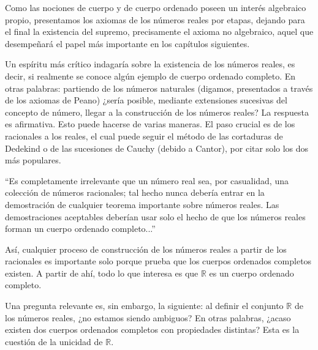 \documentclass[12pt,oneside]{book}
\begin{document}
Como las nociones de cuerpo y de cuerpo ordenado poseen un interés algebraico propio, presentamos los axiomas de los números reales por etapas, dejando para el final la existencia del supremo, precisamente el axioma no algebraico, aquel que desempeñará el papel más importante en los capítulos siguientes.

Un espíritu más crítico indagaría sobre la existencia de los números reales, es decir, si realmente se conoce algún ejemplo de cuerpo ordenado completo. En otras palabras: partiendo de los números naturales (digamos, presentados a través de los axiomas de Peano) ¿sería posible, mediante extensiones sucesivas del concepto de número, llegar a la construcción de los números reales? La respuesta es afirmativa. Esto puede hacerse de varias maneras. El paso crucial es de los racionales a los reales, el cual puede seguir el método de las cortaduras de Dedekind o de las sucesiones de Cauchy (debido a Cantor), por citar solo los dos más populares.

“Es completamente irrelevante que un número real sea, por casualidad, una colección de números racionales; tal hecho nunca debería entrar en la demostración de cualquier teorema importante sobre números reales. Las demostraciones aceptables deberían usar solo el hecho de que los números reales forman un cuerpo ordenado completo...”

Así, cualquier proceso de construcción de los números reales a partir de los racionales es importante solo porque prueba que los cuerpos ordenados completos existen. A partir de ahí, todo lo que interesa es que \(\mathbb{R}\) es un cuerpo ordenado completo.

Una pregunta relevante es, sin embargo, la siguiente: al definir el conjunto \(\mathbb{R}\) de los números reales, ¿no estamos siendo ambiguos? En otras palabras, ¿acaso existen dos cuerpos ordenados completos con propiedades distintas? Esta es la cuestión de la unicidad de \(\mathbb{R}\).
\end{document}
